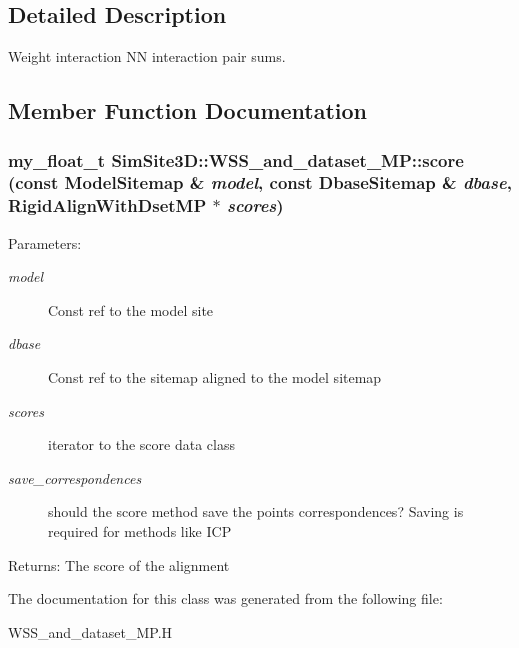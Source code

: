 \subsection{Detailed Description}
Weight interaction NN interaction pair sums. 



\subsection{Member Function Documentation}
\subsubsection{\setlength{\rightskip}{0pt plus 5cm}my\_\-float\_\-t SimSite3D::WSS\_\-and\_\-dataset\_\-MP::score (const \bf{Model\-Sitemap} \& {\em model}, const \bf{Dbase\-Sitemap} \& {\em dbase}, Rigid\-Align\-With\-Dset\-MP $\ast$ {\em scores})\hspace{0.3cm}{\tt  [inline]}}\label{classSimSite3D_1_1WSS__and__dataset__MP_e25f013ecd47d0e5e3e367f6fa06ea5e}


\begin{Desc}
\item[Parameters:]
\begin{description}
\item[{\em model}]Const ref to the model site \item[{\em dbase}]Const ref to the sitemap aligned to the model sitemap \item[{\em scores}]iterator to the score data class \item[{\em save\_\-correspondences}]should the score method save the points correspondences? Saving is required for methods like ICP \end{description}
\end{Desc}
\begin{Desc}
\item[Returns:]The score of the alignment \end{Desc}


The documentation for this class was generated from the following file:\begin{CompactItemize}
\item 
WSS\_\-and\_\-dataset\_\-MP.H\end{CompactItemize}
